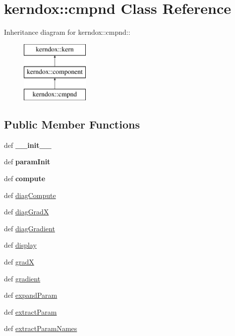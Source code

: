 \hypertarget{classkerndox_1_1cmpnd}{
\section{kerndox::cmpnd Class Reference}
\label{classkerndox_1_1cmpnd}
}
Inheritance diagram for kerndox::cmpnd::\begin{figure}[H]
\begin{center}
\leavevmode
\includegraphics[height=3cm]{classkerndox_1_1cmpnd}
\end{center}
\end{figure}
\subsection*{Public Member Functions}
\begin{CompactItemize}
\item 
\hypertarget{classkerndox_1_1cmpnd_d5d41d9195f7265a1684d4d1fd56d628}{
def \textbf{\_\-\_\-init\_\-\_\-}}
\label{classkerndox_1_1cmpnd_d5d41d9195f7265a1684d4d1fd56d628}

\item 
\hypertarget{classkerndox_1_1cmpnd_64a64b380f404eb289618bc1d9b4d7bf}{
def \textbf{paramInit}}
\label{classkerndox_1_1cmpnd_64a64b380f404eb289618bc1d9b4d7bf}

\item 
\hypertarget{classkerndox_1_1cmpnd_35e6ac83918427bcaf841711584899c2}{
def \textbf{compute}}
\label{classkerndox_1_1cmpnd_35e6ac83918427bcaf841711584899c2}

\item 
def \hyperlink{classkerndox_1_1cmpnd_7d72493b41b96c0609578f099c645502}{diagCompute}
\item 
def \hyperlink{classkerndox_1_1cmpnd_7d38f78fb440a79986244a97af3ecdef}{diagGradX}
\item 
def \hyperlink{classkerndox_1_1cmpnd_0e17dcc7e3bde7bec100461fcc4a6bb4}{diagGradient}
\item 
def \hyperlink{classkerndox_1_1cmpnd_e7de55282e4d0f93d66642f887da6544}{display}
\item 
def \hyperlink{classkerndox_1_1cmpnd_64fb3d184567fe23f6dd7be1797e8a05}{gradX}
\item 
def \hyperlink{classkerndox_1_1cmpnd_029858b6168a89349a61d417ffe99fbd}{gradient}
\item 
def \hyperlink{classkerndox_1_1cmpnd_cc6c3c268042f3e7f7bf8ec1cccd17cf}{expandParam}
\item 
def \hyperlink{classkerndox_1_1cmpnd_a93cf33b23fb72063f34423a7f738d4e}{extractParam}
\item 
def \hyperlink{classkerndox_1_1cmpnd_15e6fbd563d2d6784c353ed8c9064792}{extractParamNames}
\end{CompactItemize}
